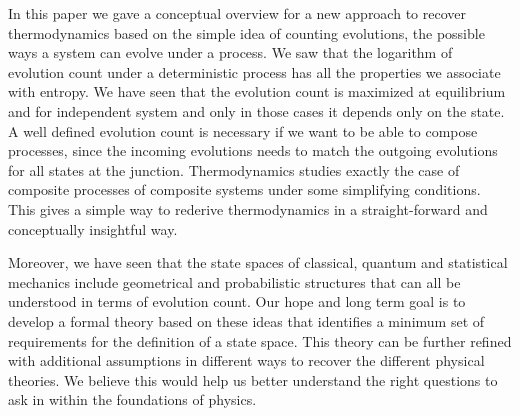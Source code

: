 \documentclass[letterpaper,twocolumn]{article}
\begin{document}
In this paper we gave a conceptual overview for a new approach to recover thermodynamics based on the simple idea of counting evolutions, the possible ways a system can evolve under a process. We saw that the logarithm of evolution count under a deterministic process has all the properties we associate with entropy. We have seen that the evolution count is maximized at equilibrium and for independent system and only in those cases it depends only on the state. A well defined evolution count is necessary if we want to be able to compose processes, since the incoming evolutions needs to match the outgoing evolutions for all states at the junction. Thermodynamics studies exactly the case of composite processes of composite systems under some simplifying conditions. This gives a simple way to rederive thermodynamics in a straight-forward and conceptually insightful way.

Moreover, we have seen that the state spaces of classical, quantum and statistical mechanics include geometrical and probabilistic structures that can all be understood in terms of evolution count. Our hope and long term goal is to develop a formal theory based on these ideas that identifies a minimum set of requirements for the definition of a state space. This theory can be further refined with additional assumptions in different ways to recover the different physical theories. We believe this would help us better understand the right questions to ask in within the foundations of physics.


\end{document}
